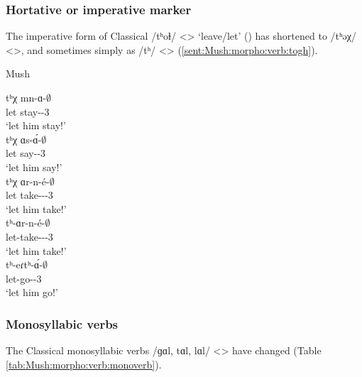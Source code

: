 \subsubsection{Hortative or imperative marker}

The imperative form of Classical /tʰoɫ/ <> `leave/let' () has shortened to /tʰəχ/ <>, and sometimes simply as /tʰ/ <> (\ref{sent:Mush:morpho:verb:togh}). 

\begin{exe}
	\ex Mush \label{sent:Mush:morpho:verb:togh}
	\begin{xlist}
		\ex \gll tʰχ mn-ɑ-$\emptyset$ \\
		let stay-{\thgloss}-3{\sg} \\
		\trans `let him stay!' \\
		\ex \gll tʰχ ɑs-\'ɑ-$\emptyset$ \\
		let say-{\thgloss}-3{\sg} \\
		\trans `let him say!' \\
		\ex \gll tʰχ ɑr-n-\'e-$\emptyset$ \\
		let take-{\vx}-{\thgloss}-3{\sg} \\
		\trans `let him take!' \\
		\ex \gll tʰ-ɑr-n-\'e-$\emptyset$ \\
		let-take-{\vx}-{\thgloss}-3{\sg} \\
		\trans `let him take!' \\
		\ex \gll tʰ-eɾtʰ-\'ɑ-$\emptyset$ \\
		let-go-{\thgloss}-3{\sg} \\
		\trans `let him go!' \\
	\end{xlist}
\end{exe}

\subsubsection{Monosyllabic verbs}

The Classical monosyllabic verbs /ɡɑl, tɑl, lɑl/ <> have changed (Table \ref{tab:Mush:morpho:verb:monoverb}). 


